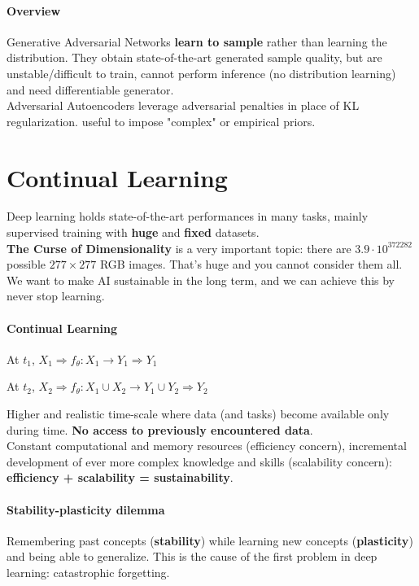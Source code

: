 \documentclass[10pt]{report}
\begin{document}
\paragraph{Overview} Generative Adversarial Networks \textbf{learn to sample} rather than learning the distribution. They obtain state-of-the-art generated sample quality, but are unstable/difficult to train, cannot perform inference (no distribution learning) and need differentiable generator.\\
Adversarial Autoencoders leverage adversarial penalties in place of KL regularization. useful to impose "complex" or empirical priors.
\pagebreak
\section{Continual Learning}
Deep learning holds state-of-the-art performances in many tasks, mainly supervised training with \textbf{huge} and \textbf{fixed} datasets.\\
\textbf{The Curse of Dimensionality} is a very important topic: there are $3.9\cdot10^{372282}$ possible $277\times277$ RGB images. That's huge and you cannot consider them all.\\
We want to make AI sustainable in the long term, and we can achieve this by never stop learning.
\paragraph{Continual Learning}
\begin{list}{}{}
	\item At $t_1$, $X_1\Longrightarrow f_\theta :X_1\rightarrow Y_1 \Longrightarrow Y_1$
	\item At $t_2$, $X_2\Longrightarrow f_\theta :X_1\cup X_2\rightarrow Y_1\cup Y_2 \Longrightarrow Y_2$
\end{list}
Higher and realistic time-scale where data (and tasks) become available only during time. \textbf{No access to previously encountered data}.\\
Constant computational and memory resources (efficiency concern), incremental development of ever more complex knowledge and skills (scalability concern): \textbf{efficiency + scalability = sustainability}.
\paragraph{Stability-plasticity dilemma} Remembering past concepts (\textbf{stability}) while learning new concepts (\textbf{plasticity}) and being able to generalize. This is the cause of the first problem in deep learning: catastrophic forgetting.
\end{document}
